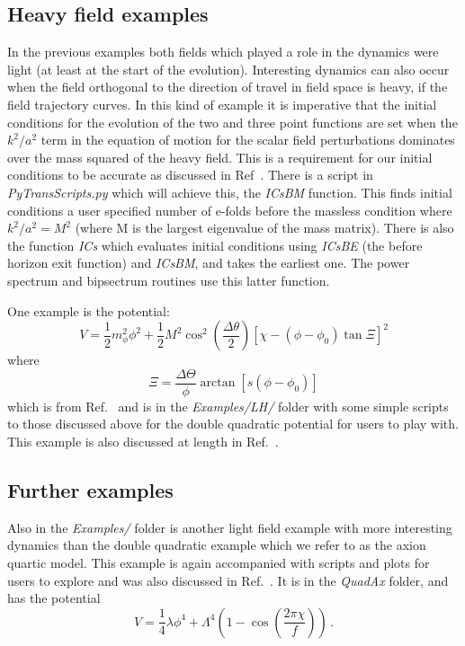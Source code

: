 \documentclass[10pt,
amsmath,amssymb,
aps,prd,nofootinbib,eqsecnum,a4paper]{revtex4}
\def\be{\begin{equation}}
\def\ee{\end{equation}}
\begin{document}
\subsection{Heavy field examples}
\label{heavy}

In the previous examples both fields which played a role in the dynamics 
were light (at least at the start of the evolution). Interesting dynamics 
can also occur when the field orthogonal to the direction of travel 
in field space is heavy, if 
the field trajectory curves. In this kind of example it is imperative that the initial conditions for the evolution of the two and three point functions 
are set when the $k^2/a^2$ term in the equation of motion for the scalar field perturbations 
dominates over the mass squared of the heavy 
field. This is a requirement for our initial conditions to be accurate as discussed in Ref~\cite{Dias:2016rjq}. 
There is a script in {\it PyTransScripts.py} which 
will achieve this, the {\it ICsBM} function. This finds initial conditions a user specified number of e-folds before the 
massless condition where $k^2/a^2=M^2$ (where M is the largest eigenvalue of the mass matrix). 
There is also the function {\it ICs} which evaluates initial conditions using {\it ICsBE} (the before horizon exit 
function) and {\it ICsBM}, and takes the earliest one. The power spectrum and bipsectrum routines use this latter function.

One example is the potential:
\be
V = \frac{1}{2} m^2_\phi \phi^2 + \frac{1}{2}M^2 \cos^2\left ( \frac{\Delta \theta}{2} \right) \left [\chi - (\phi - \phi_0 ) \tan \Xi \right]^2 
\ee
where 
\be
\Xi = \frac{\Delta \Theta}{\phi} \arctan[s (\phi - \phi_0)]
\ee
which is from Ref.~\cite{Gao:2013ota} and is in the  {\it Examples/LH/} folder with some 
simple scripts to those discussed above for the double quadratic potential for users to play with. 
This example is also discussed at length in Ref.~\cite{Dias:2016rjq}.


\subsection{Further examples}
\label{other}

Also in the {\it Examples/} folder is another light field example with more interesting dynamics than the double quadratic 
example which we refer to as the axion quartic model. This example is again accompanied 
with scripts and plots for users to explore and was also discussed in Ref.~\cite{Dias:2016rjq}. It is in the {\it QuadAx} folder, and has the potential
\be
V = \frac{1}{4} \lambda \phi^4 + \Lambda^4 \left ( 1 - \cos \left ( \frac{2\pi \chi}{f} \right) \right )\,.
\ee
\end{document}
